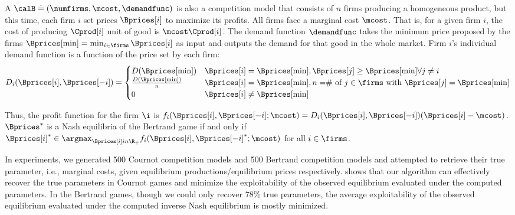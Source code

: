 A  $\calB \doteq (\numfirms, \mcost, \demandfunc)$ is also a competition model that consists of $n$ firms producing a homogeneous product, but this time, each firm $i$ set prices $\Bprices[i]$ to maximize its profits. All firms face a marginal cost $\mcost$. That is, for a given firm $i$, the cost of producing $\Cprod[i]$ unit of good is $\mcost\Cprod[i]$. The demand function $\demandfunc$ takes the minimum price proposed by the firms $\Bprices[\min]=\min_{i\in \firms} \Bprices[i]$ as input and outputs the demand for that good in the whole market. Firm $i$’s individual demand function is a function of the price set by each firm: 
\begin{align}
    D_{i}(\Bprices[i],\Bprices[-i])=\begin{cases}
        D(\Bprices[\min])  & \Bprices[i]=\Bprices[\min], \Bprices[j]\geq \Bprices[\min] \forall j\neq i\\
        \frac{D(\Bprices[\min])}{n} &\Bprices[i]=\Bprices[\min],\text{$n=$\# of $j\in \firms$ with $\Bprices[j]=\Bprices[\min]$}\\
        0 & \Bprices[i]\neq \Bprices[\min]
    \end{cases}
\end{align}


Thus, the profit function for the firm $\i$ is $f_i(\Bprices[i], \Bprices[-i]; \mcost)=D_{i}(\Bprices[i],\Bprices[-i])(\Bprices[i]-\mcost)$. $\Bprices^*$ is a Nash equilibria of the Bertrand game if and only if $\Bprices[i]^* \in \argmax_{\Bprices[i]in \R_+} f_i(\Bprices[i], \Bprices[-i]^*; \mcost)$ for all $i\in \firms$.

In experiments, we generated 500 Cournot competition models and 500 Bertrand competition models and attempted to retrieve their true parameter, i.e., marginal costs, given equilibrium productions/equilibrium prices respectively.  shows that our algorithm can effectively recover the true parameters in Cournot games and minimize the exploitability of the observed equilibrium evaluated under the computed parameters. In the Bertrand games, though we could only recover $78\%$ true parameters, the average exploitability of the observed equilibrium evaluated under the computed inverse Nash equilibrium is mostly minimized. 

